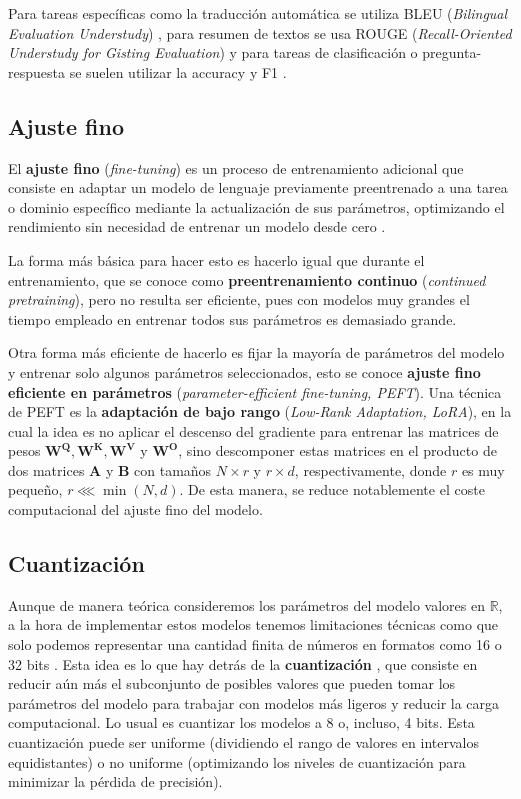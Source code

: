 \documentclass[12pt,twoside]{article}
\begin{document}
Para tareas específicas como la traducción automática se utiliza BLEU (\textit{Bilingual Evaluation Understudy}) \cite{BLEU}, para resumen de textos se usa ROUGE (\textit{Recall-Oriented Understudy for Gisting Evaluation}) \cite{ROUGE} y para tareas de clasificación o pregunta-respuesta se suelen utilizar la accuracy y F1 \cite{F1}.

\subsection{Ajuste fino}
El \textbf{ajuste fino} (\textit{fine-tuning}) es un proceso de entrenamiento adicional que consiste en adaptar un modelo de lenguaje previamente preentrenado a una tarea o dominio específico mediante la actualización de sus parámetros, optimizando el rendimiento sin necesidad de entrenar un modelo desde cero \cite{fine-tuning}.

La forma más básica para hacer esto es hacerlo igual que durante el entrenamiento, que se conoce como \textbf{preentrenamiento continuo} (\textit{continued pretraining}), pero no resulta ser eficiente, pues con modelos muy grandes el tiempo empleado en entrenar todos sus parámetros es demasiado grande.

Otra forma más eficiente de hacerlo es fijar la mayoría de parámetros del modelo y entrenar solo algunos parámetros seleccionados, esto se conoce \textbf{ajuste fino eficiente en parámetros} (\textit{parameter-efficient fine-tuning, PEFT}). Una técnica de PEFT es la \textbf{adaptación de bajo rango} (\textit{Low-Rank Adaptation, LoRA}), en la cual la idea es no aplicar el descenso del gradiente para entrenar las matrices de pesos $\mathbf{W^Q, W^K,W^V}$ y $\mathbf{W^O}$, sino descomponer estas matrices en el producto de dos matrices $\mathbf{A}$ y $\mathbf{B}$ con tamaños $N\times r$ y $r\times d$, respectivamente, donde $r$ es muy pequeño, $r\lll\min(N,d)$. De esta manera, se reduce notablemente el coste computacional del ajuste fino del modelo.

\subsection{Cuantización}
Aunque de manera teórica consideremos los parámetros del modelo valores en $\mathbb{R}$, a la hora de implementar estos modelos tenemos limitaciones técnicas como que solo podemos representar una cantidad finita de números en formatos como 16 o 32 bits \cite{bits}. Esta idea es lo que hay detrás de la \textbf{cuantización} \cite{quantization}, que consiste en reducir aún más el subconjunto de posibles valores que pueden tomar los parámetros del modelo para trabajar con modelos más ligeros y reducir la carga computacional. Lo usual es cuantizar los modelos a 8 o, incluso, 4 bits. Esta cuantización puede ser uniforme (dividiendo el rango de valores en intervalos equidistantes) o no uniforme (optimizando los niveles de cuantización para minimizar la pérdida de precisión).
\end{document}
